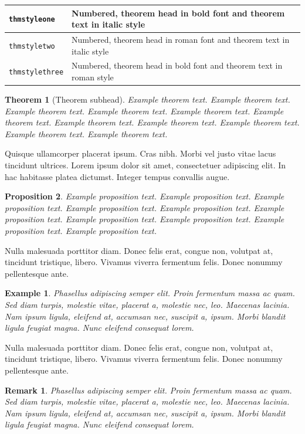 \documentclass[unnumsec,webpdf,contemporary,large]{oup-authoring-template}%
\theoremstyle{thmstyleone}%
\newtheorem{theorem}{Theorem}%
\newtheorem{proposition}[theorem]{Proposition}%
\theoremstyle{thmstyletwo}%
\newtheorem{example}{Example}%
\newtheorem{remark}{Remark}%
\theoremstyle{thmstylethree}%
\begin{document}
\medskip
\noindent\begin{tabular}{|l|p{13pc}|}
\hline
\verb+thmstyleone+ & Numbered, theorem head in bold font and theorem text in italic style \\\hline
\verb+thmstyletwo+ & Numbered, theorem head in roman font and theorem text in italic style \\\hline
\verb+thmstylethree+ & Numbered, theorem head in bold font and theorem text in roman style \\\hline
\end{tabular}


\begin{theorem}[Theorem subhead]\label{thm1}
Example theorem text. Example theorem text. Example theorem text. Example theorem text. Example theorem text.
Example theorem text. Example theorem text. Example theorem text. Example theorem text. Example theorem text.
Example theorem text.
\end{theorem}

Quisque ullamcorper placerat ipsum. Cras nibh. Morbi vel justo vitae lacus tincidunt ultrices. Lorem ipsum dolor sit
amet, consectetuer adipiscing elit. In hac habitasse platea dictumst. Integer tempus convallis augue.

\begin{proposition}
Example proposition text. Example proposition text. Example proposition text. Example proposition text. Example proposition text.
Example proposition text. Example proposition text. Example proposition text. Example proposition text. Example proposition text.
\end{proposition}

Nulla malesuada porttitor diam. Donec felis erat, congue non, volutpat at, tincidunt tristique, libero. Vivamus
viverra fermentum felis. Donec nonummy pellentesque ante.

\begin{example}
Phasellus adipiscing semper elit. Proin fermentum massa
ac quam. Sed diam turpis, molestie vitae, placerat a, molestie nec, leo. Maecenas lacinia. Nam ipsum ligula, eleifend
at, accumsan nec, suscipit a, ipsum. Morbi blandit ligula feugiat magna. Nunc eleifend consequat lorem.
\end{example}

Nulla malesuada porttitor diam. Donec felis erat, congue non, volutpat at, tincidunt tristique, libero. Vivamus
viverra fermentum felis. Donec nonummy pellentesque ante.

\begin{remark}
Phasellus adipiscing semper elit. Proin fermentum massa
ac quam. Sed diam turpis, molestie vitae, placerat a, molestie nec, leo. Maecenas lacinia. Nam ipsum ligula, eleifend
at, accumsan nec, suscipit a, ipsum. Morbi blandit ligula feugiat magna. Nunc eleifend consequat lorem.
\end{remark}
\end{document}
